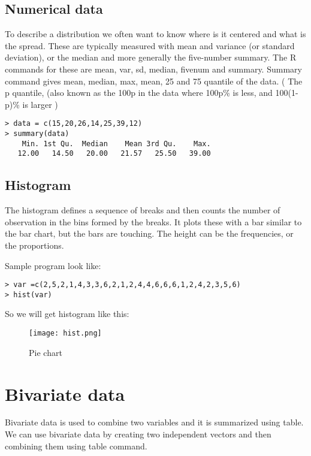 \documentclass{article}
\begin{document}
\subsection{Numerical data}
To describe a distribution we often want to know where is it centered and what is the spread. These are typically
measured with mean and variance (or standard deviation), or the median and more generally the five-number summary.
The R commands for these are mean, var, sd, median, fivenum and summary. Summary command gives mean, median, max, mean, 25 and 75 quantile of the data. ( The p quantile, (also known as the 100p%
in the data where 100p\% is less, and 100(1-p)\% is larger )

\begin{lstlisting}[frame=single ]
> data = c(15,20,26,14,25,39,12)
> summary(data)
    Min. 1st Qu.  Median    Mean 3rd Qu.    Max. 
   12.00   14.50   20.00   21.57   25.50   39.00
\end{lstlisting}

\subsection{Histogram}

The histogram defines a sequence of breaks and then counts the number of observation in the bins formed by the breaks.  It plots these with a bar similar to the bar chart, but the bars are touching. The height can
be the frequencies, or the proportions.

Sample program look like:
\begin{lstlisting}[frame=single ]
> var =c(2,5,2,1,4,3,3,6,2,1,2,4,4,6,6,6,1,2,4,2,3,5,6)
> hist(var)
\end{lstlisting}	

So we will get histogram like this:\\

 
\begin{figure}[h!]
\texttt{[image: hist.png]}
  \centering
  \caption{Pie chart}
  \label{fig:barchart1}
\end{figure}

\section{Bivariate data}
Bivariate data is used to combine two variables and it is summarized using table. We can use bivariate data by creating two independent vectors and then combining them using table command.
\end{document}
